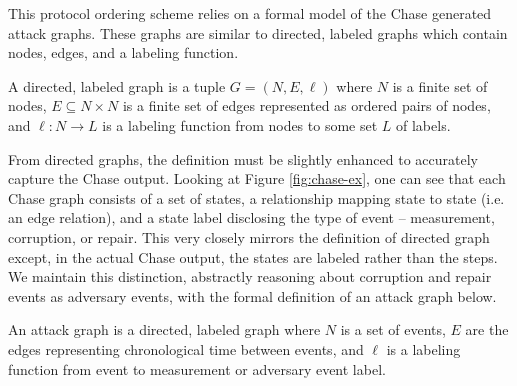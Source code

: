 \documentclass[runningheads]{llncs}
\theoremstyle{definition}
\begin{document}
This protocol ordering scheme relies on a formal model of the Chase generated attack graphs. These graphs are similar to directed, labeled graphs which contain nodes, edges, and a labeling function. 

\begin{definition}[Graph]
    A directed, labeled graph is a tuple $G = (N, E, \ell)$ where $N$ is a finite set of nodes, $E \subseteq N \times N$ is a finite set of edges represented as ordered pairs of nodes, and $\ell : N \rightarrow L$ is a labeling function from nodes to some set $L$ of labels. 
\end{definition}

From directed graphs, the definition must be slightly enhanced to accurately capture the Chase output. Looking at Figure \ref{fig:chase-ex}, one can see that each Chase graph consists of a set of states, a relationship mapping state to state (i.e. an edge relation), and a state label disclosing the type of event -- measurement, corruption, or repair. This very closely mirrors the definition of directed graph except, in the actual Chase output, the states are labeled rather than the steps. We maintain this distinction, abstractly reasoning about corruption and repair events as adversary events, with the formal definition of an attack graph below. 

\begin{definition}
    An attack graph is a directed, labeled graph where $N$ is a set of events, $E$ are the edges representing chronological time between events, and $\ell$ is a labeling function from event to measurement or adversary event label.
\end{definition}


\end{document}
